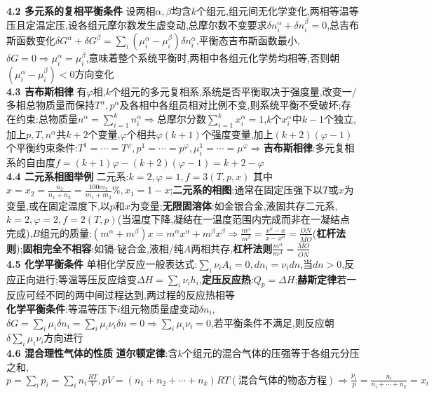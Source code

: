 \documentclass[10pt,a4paper]{article}
\begin{document}
\begin{multicols}{2}
\textbf{4.2 多元系的复相平衡条件}
设两相$\alpha,\beta$均含$k$个组元,组元间无化学变化,两相等温等压且定温定压,设各组元摩尔数发生虚变动,总摩尔数不变要求$\delta n_i^{\alpha}+\delta n_i^{\beta}=0$,总吉布斯函数变化$\delta G^{\alpha}+\delta G^{\beta}=\sum_i(\mu_i^{\alpha}-\mu_i^{\beta})\delta n_i^{\alpha}$,平衡态吉布斯函数最小,$\delta G=0\Rightarrow\mu_i^{\alpha}=\mu_i^{\beta}$,意味着整个系统平衡时,两相中各组元化学势均相等,否则朝$(\mu_i^{\alpha}-\mu_i^{\beta})<0$方向变化\\
\textbf{4.3 吉布斯相律}\quad
有$\varphi$相,$k$个组元的多元复相系,系统是否平衡取决于强度量,改变一/多相总物质量而保持$T^{\alpha},p^{\alpha}$及各相中各组员相对比例不变,则系统平衡不受破坏;存在约束:总物质量$n^{\alpha}=\sum_{i=1}^kn_i^{\alpha}\Rightarrow$总摩尔分数$\sum_{i=1}^kx_i^{\alpha}=1$,$k$个$x_i^{\alpha}$中$k-1$个独立,加上$p,T,n^{\alpha}$共$k+2$个变量,$\varphi$个相共$\varphi(k+1)$个强度变量,加上$(k+2)(\varphi-1)$个平衡约束条件:$T^1=\cdots=T^{\varphi},p^1=\cdots=p^{\varphi},\mu_i^1=\cdots=\mu^{\varphi}\Rightarrow$\textbf{吉布斯相律}:多元复相系的自由度$f=(k+1)\varphi-(k+2)(\varphi-1)=k+2-\varphi$\\
\textbf{4.4 二元系相图举例}
二元系:$k=2,\varphi=1,f=3(T,p,x)$ 其中$x=x_2=\frac{n_2}{n_1+n_2}=\frac{100m_2}{m_1+m_2}\%,x_1=1-x$;\textbf{二元系的相图}:通常在固定压强下以$T$或$x$为变量,或在固定温度下,以$p$和$x$为变量;\textbf{无限固溶体}:如金银合金,液固共存二元系,$k=2,\varphi=2,f=2(T,p)$(当温度下降,凝结在一温度范围内完成而非在一凝结点完成),$B$组元的质量:$(m^{\alpha}+m^{\beta})x=m^{\alpha}x^{\alpha}+m^{\beta}x^{\beta}\Rightarrow\frac{m^{\alpha}}{m^{\beta}}=\frac{x^{\beta}-x}{x-x^{\alpha}}=\frac{\overline{ON}}{\overline{MO}}$(\textbf{杠杆法则});\textbf{固相完全不相容}:如镉-铋合金,液相/纯$A$两相共存,\textbf{杠杆法则}$\frac{m^{\alpha}}{m^A}=\frac{\overline{MO}}{\overline{ON}}$\\
\textbf{4.5 化学平衡条件}\quad
单相化学反应一般表达式:$\sum_i\nu_iA_i=0,dn_i=\nu_idn$,当$dn>0$,反应正向进行;等温等压反应焓变$\Delta H=\sum_i\nu_ih_i$,\textbf{定压反应热}:$Q_p=\Delta H$;\textbf{赫斯定律}若一反应可经不同的两中间过程达到,两过程的反应热相等\\
\textbf{化学平衡条件}:等温等压下$i$组元物质量虚变动$\delta n_i$,$\delta G=\sum_i\mu_i\delta n_i=\sum_i\mu_i\nu_i\delta n=0\Rightarrow\sum_i\mu_i\nu_i=0$,若平衡条件不满足,则反应朝$\delta\sum_i\mu_i\nu_i$方向进行\\
\textbf{4.6 混合理性气体的性质}
\textbf{道尔顿定律}:含$k$个组元的混合气体的压强等于各组元分压之和,$p=\sum_ip_i=\sum_in_i\frac{RT}{V},pV=(n_1+n_2+\cdots+n_k)RT(\textbf{混合气体的物态方程})\Rightarrow\frac{p_i}{p}=\frac{n_i}{n_i+\cdots+n_k}=x_i$\\

\end{multicols}
\end{document}
